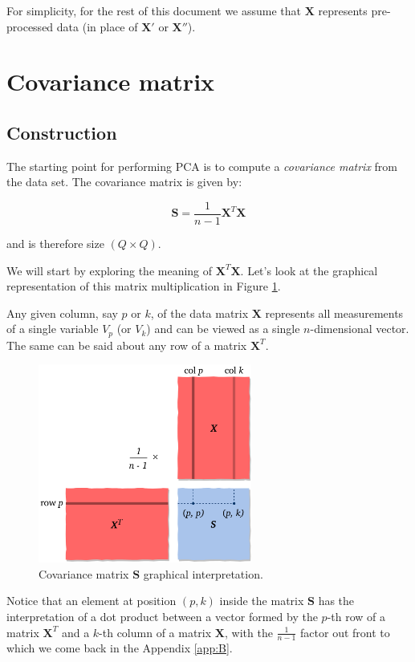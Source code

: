 \documentclass[10pt,twocolumn]{article}
\begin{document}
For simplicity, for the rest of this document we assume that $\bm{X}$ represents pre-processed data (in place of $\bm{X'}$ or $\bm{X''}$).

\section{Covariance matrix}

\subsection{Construction}

The starting point for performing PCA is to compute a \textit{covariance matrix} from the data set. The covariance matrix is given by:

\begin{equation}\label{eq:cov-matrix}
\bm{S} = \frac{1}{n-1} \bm{X}^T \bm{X}
\end{equation}

and is therefore size $(Q \times Q)$.

We will start by exploring the meaning of $\bm{X}^T \bm{X}$. Let's look at the graphical representation of this matrix multiplication in Figure \ref{fig:covariance-matrix}.

Any given column, say $p$ or $k$, of the data matrix $\bm{X}$ represents all measurements of a single variable $V_p$ (or $V_k$) and can be viewed as a single $n$-dimensional vector. The same can be said about any row of a matrix $\bm{X}^T$.

\begin{figure}[H]
\centering\includegraphics[width=7cm]{cov-matrix.png}
\caption{Covariance matrix $\bm{S}$ graphical interpretation.}
\label{fig:covariance-matrix}
\end{figure}

Notice that an element at position $(p,k)$ inside the matrix $\bm{S}$ has the interpretation of a dot product between a vector formed by the $p$-th row of a matrix $\bm{X}^T$ and a $k$-th column of a matrix $\bm{X}$, with the $\frac{1}{n-1}$ factor out front to which we come back in the Appendix \ref{app:B}.
\end{document}
